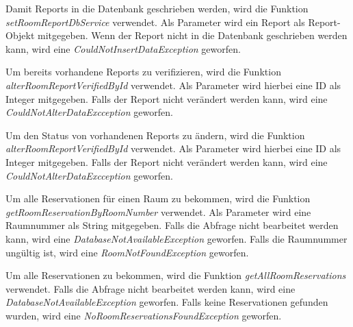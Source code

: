 

Damit Reports in die Datenbank geschrieben werden, wird die Funktion \emph{setRoomReportDbService} verwendet. Als Parameter wird ein Report als Report-Objekt mitgegeben. Wenn der Report nicht in die Datenbank geschrieben werden kann, wird eine \emph{CouldNotInsertDataException} geworfen.



Um bereits vorhandene Reports zu verifizieren, wird die Funktion \emph{alterRoomReportVerifiedById} verwendet. Als Parameter wird hierbei eine ID als Integer mitgegeben. Falls der Report nicht verändert werden kann, wird eine \emph{CouldNotAlterDataExcception} geworfen.


Um den Status von vorhandenen Reports zu ändern, wird die Funktion \emph{alterRoomReportVerifiedById} verwendet. Als Parameter wird hierbei eine ID als Integer mitgegeben. Falls der Report nicht verändert werden kann, wird eine \emph{CouldNotAlterDataExcception} geworfen.


Um alle Reservationen für einen Raum zu bekommen, wird die Funktion \emph{getRoomReservationByRoomNumber} verwendet. Als Parameter wird eine Raumnummer als String mitgegeben. Falls die Abfrage nicht bearbeitet werden kann, wird eine \emph{DatabaseNotAvailableException} geworfen. Falls die Raumnummer ungültig ist, wird eine \emph{RoomNotFoundException} geworfen.


Um alle Reservationen zu bekommen, wird die Funktion \emph{getAllRoomReservations} verwendet. Falls die Abfrage nicht bearbeitet werden kann, wird eine \emph{DatabaseNotAvailableException} geworfen. Falls keine Reservationen gefunden wurden, wird eine \emph{NoRoomReservationsFoundException} geworfen.


